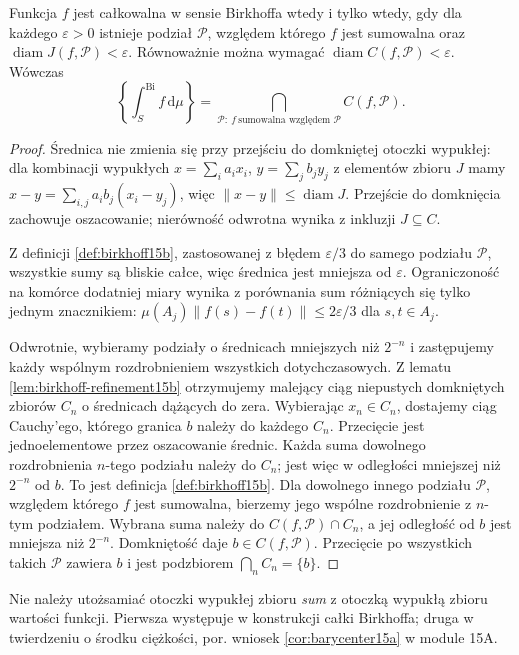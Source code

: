 \begin{twierdzenie}
\label{thm:birkhoff-convex15b}
Funkcja $f$ jest całkowalna w sensie Birkhoffa
wtedy i tylko wtedy, gdy dla każdego $\varepsilon>0$
istnieje podział $\mathcal P$, względem którego
$f$ jest sumowalna oraz
$\operatorname{diam}J(f,\mathcal P)<\varepsilon$.
Równoważnie można wymagać
$\operatorname{diam}C(f,\mathcal P)<\varepsilon$.
Wówczas
\[
 \left\{\int_S^{\mathrm{Bi}}f\,\mathrm d\mu\right\}
 =
 \bigcap_{\mathcal P:\ f\ \text{sumowalna względem }\mathcal P}
 C(f,\mathcal P).
\]
\end{twierdzenie}
\begin{proof}
Średnica nie zmienia się przy przejściu do domkniętej
otoczki wypukłej: dla kombinacji wypukłych
$x=\sum_i a_ix_i$, $y=\sum_j b_jy_j$ z elementów
zbioru $J$ mamy
$x-y=\sum_{i,j}a_ib_j(x_i-y_j)$, więc
$\|x-y\|\le\operatorname{diam}J$.
Przejście do domknięcia zachowuje oszacowanie;
nierówność odwrotna wynika z inkluzji $J\subseteq C$.

Z definicji \ref{def:birkhoff15b}, zastosowanej
z błędem $\varepsilon/3$ do samego podziału
$\mathcal P$, wszystkie sumy są bliskie całce,
więc średnica jest mniejsza od $\varepsilon$.
Ograniczoność na komórce dodatniej miary wynika
z porównania sum różniących się tylko jednym
znacznikiem: $\mu(A_j)\|f(s)-f(t)\|
\le 2\varepsilon/3$ dla $s,t\in A_j$.

Odwrotnie, wybieramy podziały o średnicach
mniejszych niż $2^{-n}$ i zastępujemy każdy
wspólnym rozdrobnieniem wszystkich dotychczasowych.
Z lematu \ref{lem:birkhoff-refinement15b} otrzymujemy
malejący ciąg niepustych domkniętych zbiorów
$C_n$ o średnicach dążących do zera.
Wybierając $x_n\in C_n$, dostajemy ciąg Cauchy'ego,
którego granica $b$ należy do każdego $C_n$.
Przecięcie jest jednoelementowe przez oszacowanie
średnic. Każda suma dowolnego rozdrobnienia
$n$-tego podziału należy do $C_n$; jest więc
w odległości mniejszej niż $2^{-n}$ od $b$.
To jest definicja \ref{def:birkhoff15b}.
Dla dowolnego innego podziału $\mathcal P$,
względem którego $f$ jest sumowalna, bierzemy
jego wspólne rozdrobnienie z $n$-tym podziałem.
Wybrana suma należy do $C(f,\mathcal P)\cap C_n$,
a jej odległość od $b$ jest mniejsza niż $2^{-n}$.
Domkniętość daje $b\in C(f,\mathcal P)$.
Przecięcie po wszystkich takich $\mathcal P$
zawiera $b$ i jest podzbiorem $\bigcap_n C_n=\{b\}$.
\end{proof}

Nie należy utożsamiać otoczki wypukłej zbioru
\emph{sum} z otoczką wypukłą zbioru wartości funkcji.
Pierwsza występuje w konstrukcji całki Birkhoffa;
druga w twierdzeniu o środku ciężkości, por.
wniosek \ref{cor:barycenter15a} w module 15A.

